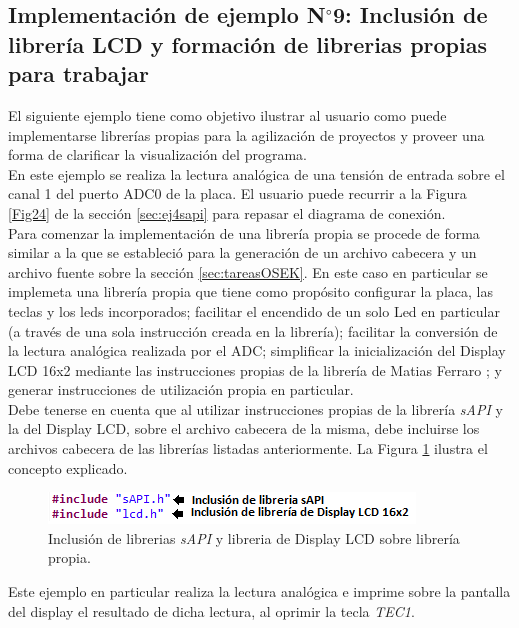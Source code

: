 \documentclass[12pt,letterpaper]{article}
\begin{document}
\subsection{Implementación de ejemplo N$^{\circ}$9: Inclusión de librería LCD y formación de librerias propias para trabajar}
El siguiente ejemplo tiene como objetivo ilustrar al usuario como puede implementarse librerías propias para la agilización de proyectos y proveer una forma de clarificar la visualización del programa.
 \\
 
En este ejemplo se realiza la lectura analógica de una tensión de entrada sobre el canal 1 del puerto ADC0 de la placa. El usuario puede recurrir a la Figura \ref{Fig24} de la sección \ref{sec:ej4sapi} para repasar el diagrama de conexión.
 \\
 
Para comenzar la implementación de una librería propia se procede de forma similar a la que se estableció para la generación de un archivo cabecera y un archivo fuente sobre la sección \ref{sec:tareasOSEK}. En este caso en particular se implemeta una librería propia que tiene como propósito configurar la placa, las teclas y los leds incorporados; facilitar el encendido de un solo Led en particular (a través de una sola instrucción creada en la librería); facilitar la conversión de la lectura analógica realizada por el ADC; simplificar la inicialización del Display LCD 16x2 mediante las instrucciones propias de la librería de Matias Ferraro ; y generar instrucciones de utilización propia en particular.
 \\
 
Debe tenerse en cuenta que al utilizar instrucciones propias de la librería \textit{sAPI} y la del Display LCD, sobre el archivo cabecera de la misma, debe incluirse los archivos cabecera de las librerías listadas anteriormente. La Figura \ref{Fig47} ilustra el concepto explicado.

\begin{figure}[!h]
\centering
\includegraphics[width=8 cm]{figuras/f40.png}
\caption{Inclusión de librerias \textit{sAPI} y libreria de Display LCD sobre librería propia.}
\label{Fig47}
\end{figure}

Este ejemplo en particular realiza la lectura analógica e imprime sobre la pantalla del display el resultado de dicha lectura, al oprimir la tecla \textit{TEC1}. 
\end{document}

